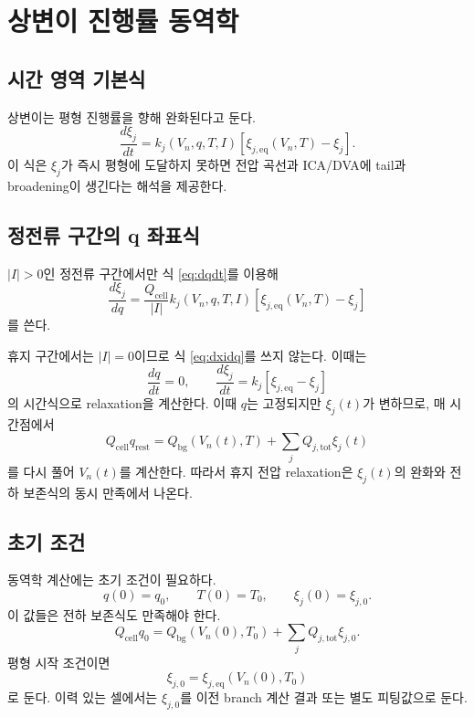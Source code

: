 \documentclass[11pt,a4paper]{article}
\newcommand{\bg}{\mathrm{bg}}
\newcommand{\cell}{\mathrm{cell}}
\newcommand{\tot}{\mathrm{tot}}
\begin{document}
\section{상변이 진행률 동역학}
\subsection{시간 영역 기본식}
상변이는 평형 진행률을 향해 완화된다고 둔다.
\begin{equation}
\boxed{
\frac{d\xi_j}{dt}=k_j(V_n,q,T,I)\left[\xi_{j,\mathrm{eq}}(V_n,T)-\xi_j\right].
}
\label{eq:dxidt}
\end{equation}
이 식은 \(\xi_j\)가 즉시 평형에 도달하지 못하면 전압 곡선과 ICA/DVA에 tail과 broadening이 생긴다는 해석을 제공한다.

\subsection{정전류 구간의 q 좌표식}
\(|I|>0\)인 정전류 구간에서만 식 \eqref{eq:dqdt}를 이용해
\begin{equation}
\boxed{
\frac{d\xi_j}{dq}=\frac{Q_{\cell}}{|I|}k_j(V_n,q,T,I)\left[\xi_{j,\mathrm{eq}}(V_n,T)-\xi_j\right]
}
\label{eq:dxidq}
\end{equation}
를 쓴다.

휴지 구간에서는 \(|I|=0\)이므로 식 \eqref{eq:dxidq}를 쓰지 않는다. 이때는
\begin{equation}
\frac{dq}{dt}=0,
\qquad
\frac{d\xi_j}{dt}=k_j\left[\xi_{j,\mathrm{eq}}-\xi_j\right]
\end{equation}
의 시간식으로 relaxation을 계산한다. 이때 \(q\)는 고정되지만 \(\xi_j(t)\)가 변하므로, 매 시간점에서
\begin{equation}
Q_{\cell}q_{\mathrm{rest}}=Q_{\bg}(V_n(t),T)+\sum_jQ_{j,\tot}\xi_j(t)
\end{equation}
를 다시 풀어 \(V_n(t)\)를 계산한다. 따라서 휴지 전압 relaxation은 \(\xi_j(t)\)의 완화와 전하 보존식의 동시 만족에서 나온다.

\subsection{초기 조건}
동역학 계산에는 초기 조건이 필요하다.
\begin{equation}
q(0)=q_0,
\qquad
T(0)=T_0,
\qquad
\xi_j(0)=\xi_{j,0}.
\end{equation}
이 값들은 전하 보존식도 만족해야 한다.
\begin{equation}
Q_{\cell}q_0=Q_{\bg}(V_n(0),T_0)+\sum_jQ_{j,\tot}\xi_{j,0}.
\end{equation}
평형 시작 조건이면
\begin{equation}
\xi_{j,0}=\xi_{j,\mathrm{eq}}(V_n(0),T_0)
\end{equation}
로 둔다. 이력 있는 셀에서는 \(\xi_{j,0}\)를 이전 branch 계산 결과 또는 별도 피팅값으로 둔다.
\end{document}
